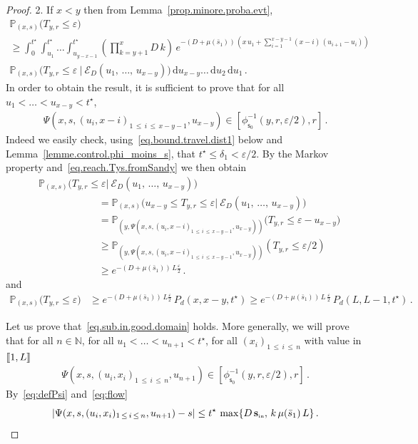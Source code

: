 \documentclass[10pt]{amsart}
\theoremstyle{definition}\newtheorem{defi}[theo]{Definition}\newtheorem{rema}[theo]{Remark}\newtheorem{exam}[theo]{Example}\newtheorem{exem}[theo]{Example}\newtheorem{nota}[theo]{Notation}
\newcommand{\llbracket}{\mathopen{[\mkern -2.7mu[}}
\newcommand{\rrbracket}{\mathclose{]\mkern -2.7mu]}}
\newcommand{\PP}{\mathbb{P}}
\newcommand{\NN}{\mathbb{N}}
\newcommand{\clE}{\mathcal{E}}
\newcommand{\Sin}{{\mathbf s}_{\textrm{\tiny\rm in}}}
\newcommand{\dif}{\mathrm{d}}
\newcommand{\barmu}{\mu(\bar s_1)}
\newcommand{\ens}[2]{\left[#1,#2\right]}
\newcommand{\phis}{\phi_{\textsf{s}_0}^{-1}}
\newcommand{\setunL}{\llbracket 1, L\rrbracket}
\newcommand{\1}{\mathbf{1}}
\begin{document}
\begin{proof}
2. If $x<y$ then from Lemma~\ref{prop.minore.proba.evt},
\begin{multline}\label{eq.proba.atteinte.depuis.S}
\PP_{(x,s)}
\Big(T_{y,r} \leq \varepsilon\Big)
\\
\geq \int_0^{t^\star} \int_{u_1}^{t^\star}\dots \int_{u_{y-x-1}}^{t^\star}
\left(\prod_{k=y+1}^{x}D\,k\right)\, e^{-(D+\barmu)\,\left(x\,u_1+
\sum\limits_{i=1}^{x-y-1}(x-i)\,(u_{i+1}-u_{i})\right)}\,
\\
\PP_{(x,s)}
\Big(T_{y,r} \leq \varepsilon \ \Big| \ \clE_D(u_1,\,\dots,\,u_{x-y}) \Big)\,
\dif u_{x-y}\dots\,\dif u_2\,\dif u_1\,.
\end{multline}
In order to obtain the result, it is sufficient to prove that for all $u_1<\dots <u_{x-y}<t^\star$,
\begin{align}\label{eq.sub.in.good.domain}
\Psi\left(x,s,(u_i,x-i)_{1\,\leq\,i\,\leq\,x-y-1},u_{x-y}\right)\in \ens{\phis(y,r, \varepsilon/2)}{r}\,.
\end{align}
Indeed we easily check, using~\eqref{eq.bound.travel.dist1} below and Lemma~\ref{lemme.control.phi_moins_s}, that $t^\star\leq \delta_1<\varepsilon/2$. By the Markov property and~\eqref{eq.reach.Tys.fromSandy} we then obtain
\begin{align*}
&\PP_{(x,s)}
\Big(T_{y,r} \leq \varepsilon \Big| \ \clE_D(u_1,\,\dots,\,u_{x-y}) \Big)
\\
&\qquad\qquad\qquad =
\PP_{(x,s)}
\Big(u_{x-y} \leq T_{y,r} \leq \varepsilon \Big| \ \clE_D(u_1,\,\dots,\,u_{x-y}) \Big)
\\
&\qquad\qquad\qquad =
\PP_{\left(y,\Psi\left(x,s,(u_i,x-i)_{1\,\leq\,i\,\leq\,x-y-1},u_{x-y}\right)\right)}
\Big(T_{y,r} \leq \varepsilon-u_{x-y} \Big)
\\
&\qquad\qquad\qquad \geq
\PP_{\left(y,\Psi\left(x,s,(u_i,x-i)_{1\,\leq\,i\,\leq\,x-y-1},u_{x-y}\right)\right)}
\left(T_{y,r} \leq \varepsilon/2 \right)
\\
&\qquad\qquad\qquad \geq e^{-(D+\barmu)\,L\frac{\varepsilon}{2}}\,.
\end{align*}
and
\begin{align*}
\PP_{(x,s)}
\Big(T_{y,r} \leq \varepsilon\Big) &\geq e^{-(D+\barmu)\,L\frac{\varepsilon}{2}}\, P_d(x,x-y, t^\star)
\geq e^{-(D+\barmu)\,L\,\frac{\varepsilon}{2}}\, P_d(L,L-1, t^\star)\,.
\end{align*}

Let us prove that~\eqref{eq.sub.in.good.domain} holds. More generally, we will prove that for all $n\in \NN$, for all $u_1<\dots< u_{n+1}<t^\star$, for all $(x_i)_{1\,\leq\,i\,\leq\,n}$ with value in $\setunL$
\begin{align}\label{eq.sub.in.good.domain.general}
\Psi\left(x,s,(u_i,x_i)_{1\,\leq\,i\,\leq\,n},u_{n+1}\right)\in \ens{\phis(y,r, \varepsilon/2)}{r}\,.
\end{align}
By~\eqref{eq:defPsi} and~\eqref{eq:flow}
\begin{equation}\label{eq.bound.travel.dist}
\left|\Psi(x,s,(u_i,x_i)_{1\,\leq\,i\,\leq\,n},u_{n+1})-s\right| \leq t^\star\,\max\{D\,\Sin,\, k\,\barmu\,L\}\,.
\end{equation}


\end{proof}
\end{document}

